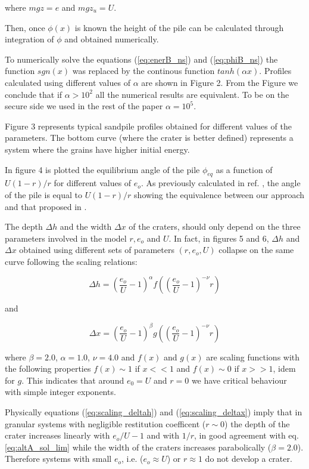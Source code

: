 \noindent where $mgz=e$ and $mgz_u=U$.

Then, once $\phi(x)$ is known the height of the pile can be calculated
through integration of $\phi$ and obtained numerically.

To numerically 
solve the equations (\ref{eq:enerB_ns}) and (\ref{eq:phiB_ns}) the
function $sgn(x)$ was replaced by  the continous function
$tanh(\alpha x)$. Profiles calculated using different values of
$\alpha$ are shown in Figure 2. From the Figure we conclude that if
$\alpha>10^2$ all the numerical results are equivalent. To  be on the
secure side we used in the rest of the paper $\alpha=10^5$.

Figure 3 represents typical sandpile profiles obtained for different
values of the parameters. The bottom curve (where the crater is better
defined) represents a system where the grains have higher initial energy.

In figure 4 is plotted the equilibrium angle of the pile $\phi_{eq}$
as a function of
$U(1-r)/r$ for different values of $e_o$. As previously calculated in ref.
\cite{Alonso_97}, the angle of the pile is equal to $U(1-r)/r$ showing
the equivalence between our approach and
that proposed in \cite{Grasselli_98}. 


The depth $\Delta h$ and the width $\Delta x$ of the craters, should only 
depend on the three parameters involved in the model $r,e_o$ and $U$. 
In fact, in figures 5 and 6,  
$\Delta h$ and  $\Delta x$ 
obtained using different sets of parameters $(r,e_o,U)$ collapse on 
the same curve following the scaling relations:

\begin{equation}
\Delta h = (\frac{e_o}{U}-1)^\alpha f((\frac{e_o}{U}-1)^{-\nu} r)
\label{eq:scaling_deltah}
\end{equation}

\noindent and

\begin{equation}
\Delta x = (\frac{e_o}{U}-1)^\beta g((\frac{e_o}{U}-1)^{-\nu} r)
\label{eq:scaling_deltax}
\end{equation}

\noindent where $\beta=2.0$, $\alpha=1.0$, $\nu=4.0$ and $f(x)$ 
and $g(x)$ are
scaling functions with the following properties $f(x) \sim 1 $ if $x<<1$ and 
$f(x) \sim 0$ if $x>>1$, idem for $g$. 
This indicates that around $e_0=U$ and $r=0$ we have 
critical behaviour with simple integer exponents. 

Physically equations (\ref{eq:scaling_deltah}) and (\ref{eq:scaling_deltax})
imply that in granular systems with negligible restitution coefficent ($r \sim 0$) the depth of the crater increases linearly
with $e_o/U-1$ and with $1/r$, in good agreement with
 eq.\ref{eq:altA_sol_lim} while the width of the craters 
increases parabolically ($\beta=2.0$). Therefore 
systems with small $e_o$, i.e. ($e_o \approx U$) or 
$r \approx 1$ do not develop a crater. 


